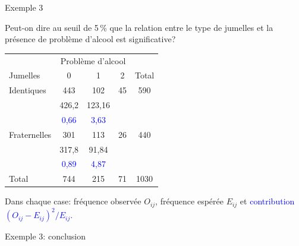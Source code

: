 \documentclass{BeamerTemplate}
\begin{document}
\begin{frame}[t]{Exemple 3}

\small
Peut-on dire au seuil de 5\,\% que la relation entre le type de jumelles et la
présence de problème d'alcool est significative?

\medskip
\begin{center}
\renewcommand{\arraystretch}{1.15}
\begin{tabular}{l|ccc|c}
 & \multicolumn{3}{c|}{Problème d'alcool} & \\
Jumelles & 0 & 1 & 2 & Total\\
\hline
Identiques & 443 & 102 & 45 & 590\\
 & \textcolor{burntorange}{426,2} & \textcolor{burntorange}{123,16} & & \\
 & \textcolor{blue}{0,66} & \textcolor{blue}{3,63} & & \\
\hline
Fraternelles & 301 & 113 & 26 & 440\\
 & \textcolor{burntorange}{317,8} & \textcolor{burntorange}{91,84} & & \\
 & \textcolor{blue}{0,89} & \textcolor{blue}{4,87} & & \\
\hline
Total & 744 & 215 & 71 & 1030\\
\end{tabular}
\end{center}

{\scriptsize Dans chaque case: fréquence observée $O_{ij}$,
\textcolor{burntorange}{fréquence espérée $E_{ij}$} et
\textcolor{blue}{contribution $(O_{ij}-E_{ij})^2/E_{ij}$}.}

\end{frame}

\begin{frame}[t]{Exemple 3: conclusion}

\vspace{5cm}

\end{frame}
\end{document}
